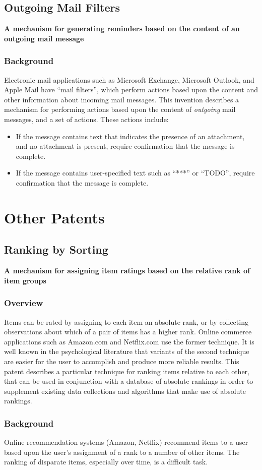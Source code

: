 \documentclass{article}
\newcommand{\ptitle}[1]{\textbf{#1}}
\newcommand{\pbackground}{\subsubsection{Background}}
\newcommand{\poverview}{\subsubsection{Overview}}
\begin{document}
\subsection{Outgoing Mail Filters}
\ptitle{A mechanism for generating reminders based on the content of an outgoing mail message}

\pbackground
Electronic mail applications such as Microsoft Exchange, Microsoft Outlook, and Apple Mail have ``mail filters'', which perform actions based upon the content and other information about incoming mail messages.  This invention describes a mechanism for performing actions based upon the content of \emph{outgoing} mail messages, and a set of actions.  These actions include:

\begin{itemize}
\item If the message contains text that indicates the presence of an attachment, and no attachment is present, require confirmation that the message is complete.
\item If the message contains user-specified text such as ``***'' or ``TODO'', require confirmation that the message is complete.
\end{itemize}


\section{Other Patents}
\subsection{Ranking by Sorting}

\ptitle{A mechanism for assigning item ratings based on the relative rank of item groups}

\poverview
Items can be rated by assigning to each item an absolute rank, or by collecting observations about which of a pair of items has a higher rank.  Online commerce applications such as Amazon.com and Netflix.com use the former technique.  It is well known in the psychological literature that variants of the second technique are easier for the user to accomplish and produce more reliable results.  This patent describes a particular technique for ranking items relative to each other, that can be used in conjunction with a database of absolute rankings in order to supplement existing data collections and algorithms that make use of absolute rankings.

\pbackground
Online recommendation systems (Amazon, Netflix) recommend items to a user based upon the user's assignment of a rank to a number of other items.  The ranking of disparate items, especially over time, is a difficult task.
\end{document}
